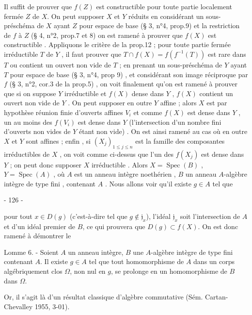 Il suffit de prouver que $f(Z)$ est constructible pour toute partie localement fermée $Z$ de $X$. On peut supposer $X$ et $Y$ réduits en considérant un sous-préschéma de $X$ ayant $Z$ pour espace de base (§ 3, n°4, prop.9) et la restriction de $f$ à $Z$ (§ 4, n°2, prop.7 et 8) on est ramené à prouver que $f(X)$ est constructible . Appliquons le critère de la prop.12 ; pour toute partie fermée irréductible $T$ de $Y$ , il faut prouver que $T \cap f(X) = f(f^{-1}(T))$ est rare dans $T$ ou contient un ouvert non vide de $T$ ; en prenant un sous-préschéma de $Y$ ayant $T$ pour espace de base (§ 3, n°4, prop 9) , et considérant son image réciproque par $f$ (§ 3, n°2, cor.3 de la prop.5) , on voit finalement qu'on est ramené à prouver que si on suppose $Y$ irréductible et $f(X)$ dense dans $Y$ , $f(X)$ contient un ouvert non vide de $Y$ . On peut supposer en outre $Y$ affine ; alors $X$ est par hypothèse réunion finie d'ouverts affines $V_i$ et comme $f(X)$ est dense dans $Y$ , un au moins des $f(V_i)$ est dense dans $Y$ (l'intersection d'un nombre fini d'ouverts non vides de $Y$ étant non vide) . On est ainsi ramené au cas où en outre $X$ et $Y$ sont affines ; enfin , si $(X_j)_{1 \le j \le n}$ est la famille des composantes irréductibles de $X$ , on voit comme ci-dessus que l'un des $f(X_j)$ est dense dans $Y$ ; on peut donc supposer $X$ irréductible . Alors $X = \operatorname{Spec}(B)$ , $Y = \operatorname{Spec}(A)$ , où $A$ est un anneau intègre noethérien , $B$ un anneau $A$-algèbre intègre de type fini , contenant $A$ . Nous allons voir qu'il existe $g \in A$ tel que


\newpage


- 126 -

pour tout $x \in D(g)$ (c'est-à-dire tel que $g \notin \mathfrak{j}_x$), l'idéal $\mathfrak{j}_x$ soit l'intersection de $A$ et d'un idéal premier de $B$, ce qui prouvera que $D(g) \subset f(X)$. On est donc ramené à démontrer le

Lomme 6. - Soient $A$ un anneau intègre, $B$ une $A$-algèbre intègre de type fini contenant $A$. Il existe $g \in A$ tel que tout homomorphisme de $A$ dans un corps algébriquement clos $\Omega$, non nul en $g$, se prolonge en un homomorphisme de $B$ dans $\Omega$.

Or, il s'agit là d'un résultat classique d'algèbre commutative (Sém. Cartan-Chevalley 1955, 3-01).

